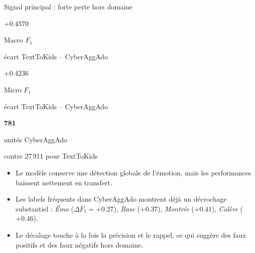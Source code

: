 \documentclass[aspectratio=169,xcolor=table]{beamer}
\newcommand{\metricbox}[3]{%
  \begin{minipage}[t]{0.31\textwidth}
    \setlength{\fboxsep}{0pt}%
    \colorbox{softSurface}{%
      \begin{minipage}[t][1.65cm][c]{\linewidth}
        \centering
        {\Large\bfseries #1}\par
        \vspace{0.15em}
        {\scriptsize\color{emotycMuted}#2}\par
        \vspace{0.15em}
        {\scriptsize #3}
      \end{minipage}%
    }
  \end{minipage}%
}
\begin{document}
\begin{frame}{Signal principal : forte perte hors domaine}
  \metricbox{$+0.4570$}{Macro $F_1$}{\'ecart TextToKids -- CyberAggAdo}
  \hfill
  \metricbox{$+0.4236$}{Micro $F_1$}{\'ecart TextToKids -- CyberAggAdo}
  \hfill
  \metricbox{781}{unit\'es CyberAggAdo}{contre 27\,911 pour TextToKids}

  \vspace{1.5em}
  \begin{itemize}
    \item Le mod\`ele conserve une d\'etection globale de l'\'emotion, mais les performances baissent nettement en transfert.
    \item Les labels fr\'equents dans CyberAggAdo montrent d\'ej\`a un d\'ecrochage substantiel : \textit{\'Emo} ($\Delta F_1=+0.27$), \textit{Base} ($+0.37$), \textit{Montr\'ee} ($+0.41$), \textit{Col\`ere} ($+0.46$).
    \item Le d\'ecalage touche \`a la fois la pr\'ecision et le rappel, ce qui sugg\`ere des faux positifs et des faux n\'egatifs hors domaine.
  \end{itemize}
\end{frame}
\end{document}
